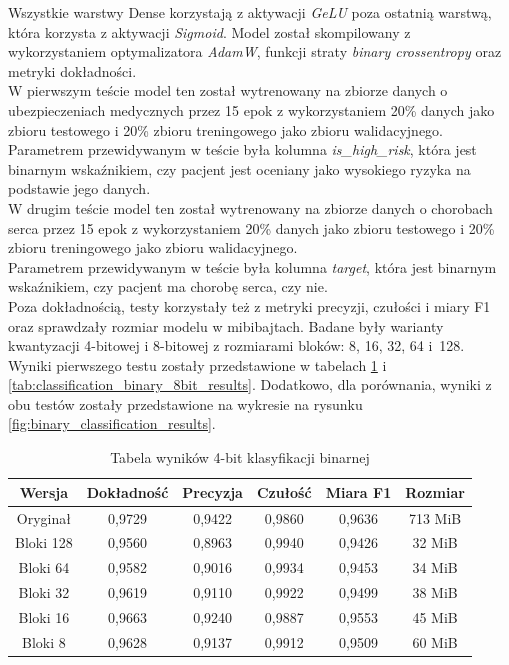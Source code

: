 Wszystkie warstwy Dense korzystają z aktywacji \textit{GeLU} poza ostatnią warstwą, która korzysta z aktywacji \textit{Sigmoid}. Model został skompilowany z wykorzystaniem optymalizatora \textit{AdamW}, funkcji straty \textit{binary crossentropy} oraz metryki dokładności. \\
W pierwszym teście model ten został wytrenowany na zbiorze danych o ubezpieczeniach medycznych przez 15 epok z wykorzystaniem 20\% danych jako zbioru testowego i 20\% zbioru treningowego jako zbioru walidacyjnego. \\
Parametrem przewidywanym w teście była kolumna \textit{is\_high\_risk}, która jest binarnym wskaźnikiem, czy pacjent jest oceniany jako wysokiego ryzyka na podstawie jego danych. \\
W drugim teście model ten został wytrenowany na zbiorze danych o chorobach serca przez 15 epok z wykorzystaniem 20\% danych jako zbioru testowego i 20\% zbioru treningowego jako zbioru walidacyjnego. \\
Parametrem przewidywanym w teście była kolumna \textit{target}, która jest binarnym wskaźnikiem, czy pacjent ma chorobę serca, czy nie. \\
Poza dokładnością, testy korzystały też z metryki precyzji, czułości i miary F1 oraz sprawdzały rozmiar modelu w mibibajtach. Badane były warianty kwantyzacji 4-bitowej i 8-bitowej z rozmiarami bloków: 8, 16, 32, 64 i~128. \\
Wyniki pierwszego testu zostały przedstawione w tabelach \ref{tab:classification_binary_4bit_results} i \ref{tab:classification_binary_8bit_results}. Dodatkowo, dla porównania, wyniki z obu testów zostały przedstawione na wykresie na rysunku \ref{fig:binary_classification_results}.
\begin{table}
    \centering
    \caption{Tabela wyników 4-bit klasyfikacji binarnej}
    \label{tab:classification_binary_4bit_results}
    \begin{tabular}{|c|c|c|c|c|c|}
        \hline
        \textbf{Wersja} & \textbf{Dokładność} & \textbf{Precyzja} & \textbf{Czułość} & \textbf{Miara F1} & \textbf{Rozmiar} \\
        \hline
        Oryginał & 0,9729 & 0,9422 & 0,9860 & 0,9636 & 713 MiB \\
        \hline
        Bloki 128 & 0,9560 & 0,8963 & 0,9940 & 0,9426 & 32 MiB \\
        \hline
        Bloki 64 & 0,9582 & 0,9016 & 0,9934 & 0,9453 & 34 MiB \\
        \hline
        Bloki 32 & 0,9619 & 0,9110 & 0,9922 & 0,9499 & 38 MiB \\
        \hline
        Bloki 16 & 0,9663 & 0,9240 & 0,9887 & 0,9553 & 45 MiB \\
        \hline
        Bloki 8 & 0,9628 & 0,9137 & 0,9912 & 0,9509 & 60 MiB \\
        \hline
    \end{tabular}
\end{table}
